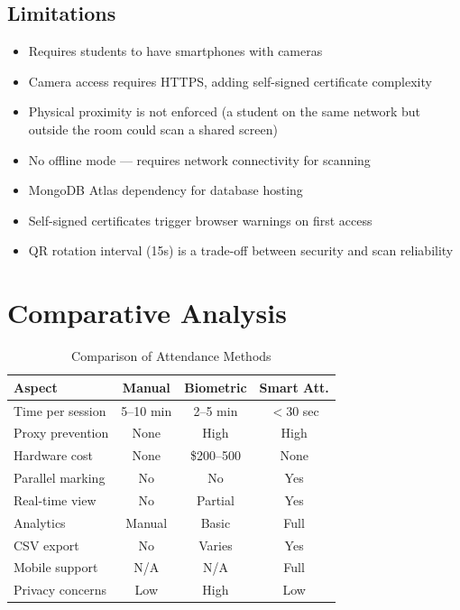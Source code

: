 \documentclass[conference]{IEEEtran}
\begin{document}
\subsection{Limitations}
\begin{itemize}
\item Requires students to have smartphones with cameras
\item Camera access requires HTTPS, adding self-signed certificate complexity
\item Physical proximity is not enforced (a student on the same network but outside the room could scan a shared screen)
\item No offline mode --- requires network connectivity for scanning
\item MongoDB Atlas dependency for database hosting
\item Self-signed certificates trigger browser warnings on first access
\item QR rotation interval (15s) is a trade-off between security and scan reliability
\end{itemize}

\section{Comparative Analysis}

\begin{table}[htbp]
\caption{Comparison of Attendance Methods}
\begin{center}
\begin{tabular}{|l|c|c|c|}
\hline
\textbf{Aspect} & \textbf{Manual} & \textbf{Biometric} & \textbf{Smart Att.} \\
\hline
Time per session & 5--10 min & 2--5 min & $<$30 sec \\
\hline
Proxy prevention & None & High & High \\
\hline
Hardware cost & None & \$200--500 & None \\
\hline
Parallel marking & No & No & Yes \\
\hline
Real-time view & No & Partial & Yes \\
\hline
Analytics & Manual & Basic & Full \\
\hline
CSV export & No & Varies & Yes \\
\hline
Mobile support & N/A & N/A & Full \\
\hline
Privacy concerns & Low & High & Low \\
\hline
\end{tabular}
\label{tab:comparison}
\end{center}
\end{table}
\end{document}
